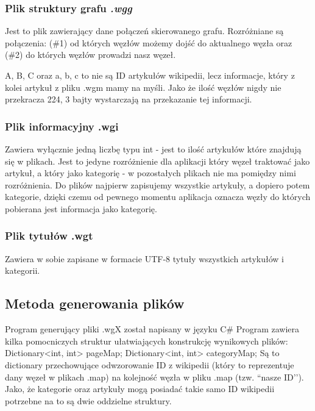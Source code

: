 \subsubsection{Plik struktury grafu \textit{.wgg}}

Jest to plik zawierający dane połączeń skierowanego grafu. Rozróżniane są połączenia: (\#1) od których węzłów możemy dojść do aktualnego węzła oraz (\#2) do których węzłów prowadzi nasz węzeł.



A, B, C oraz a, b, c to nie są ID artykułów wikipedii, lecz informacje, który z kolei artykuł z pliku .wgm mamy na myśli. Jako że ilość węzłów nigdy nie przekracza 224, 3 bajty wystarczają na przekazanie tej informacji.

\subsubsection{Plik informacyjny .wgi}

Zawiera wyłącznie jedną liczbę typu int - jest to ilość artykułów które znajdują się w plikach. Jest to jedyne rozróżnienie dla aplikacji który węzeł traktować jako artykuł, a który jako kategorię - w pozostałych plikach nie ma pomiędzy nimi rozróżnienia. Do plików najpierw zapisujemy wszystkie artykuły, a dopiero potem kategorie, dzięki czemu od pewnego momentu aplikacja oznacza węzły do których pobierana jest informacja jako kategorię. 

\subsubsection{Plik tytułów .wgt}

Zawiera w sobie zapisane w formacie UTF-8 tytuły wszystkich artykułów i kategorii.

\subsection{Metoda generowania plików}

Program generujący pliki .wgX został napisany w języku C\#
Program zawiera kilka pomocniczych struktur ułatwiających konstrukcję wynikowych plików:
Dictionary<int, int> pageMap;
Dictionary<int, int> categoryMap;
Są to dictionary przechowujące odwzorowanie ID z wikipedii (który to reprezentuje dany węzeł w plikach .map) na kolejność węzła w pliku .map (tzw. ``nasze ID’’). Jako, że kategorie oraz artykuły mogą posiadać takie samo ID wikipedii potrzebne na to są dwie oddzielne struktury.

